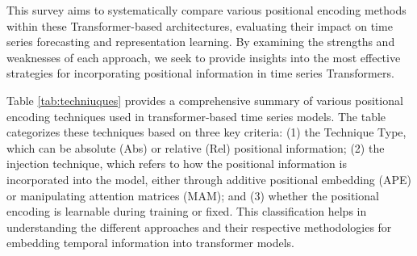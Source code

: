 This survey aims to systematically compare various positional encoding methods within these Transformer-based architectures, evaluating their impact on time series forecasting and representation learning. By examining the strengths and weaknesses of each approach, we seek to provide insights into the most effective strategies for incorporating positional information in time series Transformers.
 
Table \ref{tab:techniuques} provides a comprehensive summary of various positional encoding techniques used in transformer-based time series models. The table categorizes these techniques based on three key criteria: (1) the Technique Type, which can be absolute (Abs) or relative (Rel) positional information; (2) the injection technique, which refers to how the positional information is incorporated into the model, either through additive positional embedding (APE) or manipulating attention matrices (MAM); and (3) whether the positional encoding is learnable during training or fixed. This classification helps in understanding the different approaches and their respective methodologies for embedding temporal information into transformer models.





